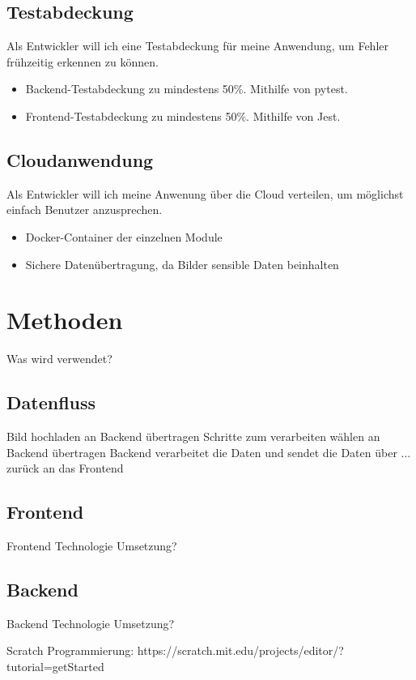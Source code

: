 \documentclass[conference]{IEEEtran}
\begin{document}
\subsection{Testabdeckung}
Als Entwickler will ich eine Testabdeckung für meine Anwendung, um Fehler frühzeitig erkennen zu können.
\begin{itemize}
	\item Backend-Testabdeckung zu mindestens 50\%. Mithilfe von pytest.
	\item Frontend-Testabdeckung zu mindestens 50\%. Mithilfe von Jest.
\end{itemize}

\subsection{Cloudanwendung}
Als Entwickler will ich meine Anwenung über die Cloud verteilen, um möglichst einfach Benutzer anzusprechen.
\begin{itemize}
	\item Docker-Container der einzelnen Module
	\item Sichere Datenübertragung, da Bilder sensible Daten beinhalten
\end{itemize}


\section{Methoden}
Was wird verwendet?

\subsection{Datenfluss}
Bild hochladen  an Backend übertragen
Schritte zum verarbeiten wählen an Backend übertragen
Backend verarbeitet die Daten und sendet die Daten über ... zurück an das Frontend

\subsection{Frontend}
Frontend Technologie
Umsetzung?

\subsection{Backend}
Backend Technologie
Umsetzung?

\begin{thebibliography}{00}
	 Scratch Programmierung: https://scratch.mit.edu/projects/editor/?tutorial=getStarted
\end{thebibliography}
\vspace{12pt}
\end{document}
